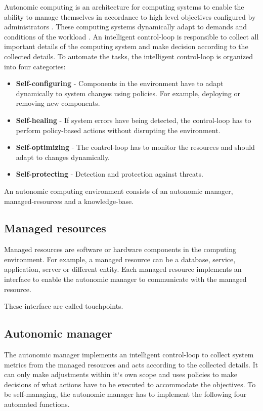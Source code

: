 Autonomic computing is an architecture for computing systems to enable the ability to manage themselves in accordance to high level objectives configured by administrators \cite{Kephart2003VisionComputing}. 
These computing systems dynamically adapt to demands and conditions of the workload \cite{Kephart2003VisionComputing}.
An intelligent control-loop is responsible to collect all important details of the computing system and make decision according to the collected details. To automate the tasks, the intelligent control-loop is organized into four categories:

\begin{itemize}
\item \textbf{Self-configuring}
- Components in the environment have to adapt dynamically to system changes using policies. For example, deploying or removing new components.

\item \textbf{Self-healing}
- If system errors have being detected, the control-loop has to perform policy-based actions without disrupting the 
environment.

\item \textbf{Self-optimizing}
- The control-loop has to monitor the resources and should adapt to changes dynamically.

\item \textbf{Self-protecting}
- Detection and protection against threats.

\end{itemize}

 An autonomic computing environment consists of an autonomic manager, managed-resources and a knowledge-base.
 
\subsection{Managed resources}
Managed resources are software or hardware components in the computing environment. For example, a managed resource 
can be a database, service, application, server or different entity. Each managed resource implements an interface to enable 
the autonomic manager to communicate with the managed resource. 

These interface are called touchpoints.

\subsection{Autonomic manager}
The autonomic manager implements an intelligent control-loop to collect system metrics from the managed resources and acts according to the collected details. It can only make adjustments within it`s own scope and uses policies to make decisions of what actions have to be
executed to accommodate the objectives.
To be self-managing, the autonomic manager has to implement the following four automated functions.

